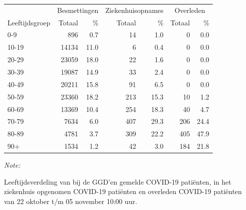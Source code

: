 \documentclass[
  english,
  man,floatsintext]{apa6}
\begin{document}
\begin{table}[H]
\centering\begingroup\fontsize{11}{13}\selectfont

\begin{threeparttable}
\begin{tabular}{lrrrrrr}
\toprule
\multicolumn{1}{c}{ } & \multicolumn{2}{c}{Besmettingen} & \multicolumn{2}{c}{Ziekenhuisopnames} & \multicolumn{2}{c}{Overleden} \\
\cmidrule(l{3pt}r{3pt}){2-3} \cmidrule(l{3pt}r{3pt}){4-5} \cmidrule(l{3pt}r{3pt}){6-7}
Leeftijdsgroep & Totaal & \% & Totaal & \% & Totaal & \%\\
\midrule
0-9 & 896 & 0.7 & 14 & 1.0 & 0 & 0.0\\
10-19 & 14134 & 11.0 & 6 & 0.4 & 0 & 0.0\\
20-29 & 23059 & 18.0 & 22 & 1.6 & 0 & 0.0\\
30-39 & 19087 & 14.9 & 33 & 2.4 & 0 & 0.0\\
40-49 & 20211 & 15.8 & 91 & 6.5 & 0 & 0.0\\
50-59 & 23360 & 18.2 & 213 & 15.3 & 10 & 1.2\\
60-69 & 13369 & 10.4 & 254 & 18.3 & 40 & 4.7\\
70-79 & 7634 & 6.0 & 407 & 29.3 & 206 & 24.4\\
80-89 & 4781 & 3.7 & 309 & 22.2 & 405 & 47.9\\
90+ & 1534 & 1.2 & 42 & 3.0 & 184 & 21.8\\
\bottomrule
\end{tabular}
\begin{tablenotes}
\item \textit{Note: } 
\item Leeftijdsverdeling van bij de GGD’en gemelde COVID-19 patiënten, in het ziekenhuis opgenomen COVID-19 patiënten en overleden COVID-19 patiënten van 22 oktober t/m 05 november 10:00 uur.
\end{tablenotes}
\end{threeparttable}
\endgroup{}
\end{table}
\end{document}
